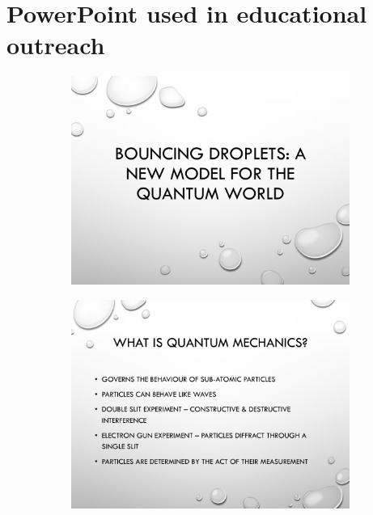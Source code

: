 \section{PowerPoint used in educational outreach} \label{app:powerpoint}

\begin{figure}[hb]
\begin{subfigure}{0.475\textwidth}
\includegraphics[width=\textwidth]{education/ppt/01.png}
\end{subfigure}
\hfill
\begin{subfigure}{0.475\textwidth}
\includegraphics[width=\textwidth]{education/ppt/02.png}
\end{subfigure}
\\


\end{figure}
